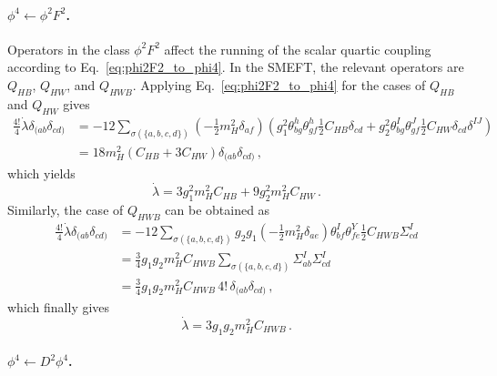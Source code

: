 \paragraph{\texorpdfstring{$\phi^4\leftarrow \phi^2 F^2$}{phi4fromphi2F2}.} 
Operators in the class $\phi^2 F^2$ affect the running of the scalar quartic coupling according to Eq.~\eqref{eq:phi2F2_to_phi4}. In the SMEFT, the relevant operators are $Q_{HB}$, $Q_{HW}$, and $Q_{HWB}$. Applying Eq.~\eqref{eq:phi2F2_to_phi4} for the cases of $Q_{HB}$ and $Q_{HW}$ gives
\begin{align}
    \frac{4!}{4}\dot{\lambda}\delta_{(ab}\delta_{cd)} &= - 12 \sum_{\sigma(\{a,b,c,d\})} \left(-\frac{1}{2}m_H^2\delta_{af}\right)\left( g_1^2\theta_{bg}^h\theta_{gf}^h\frac{1}{2}C_{HB}\delta_{cd}+g_2^2\theta_{bg}^I\theta_{gf}^J\frac{1}{2}C_{HW}\delta_{cd}\delta^{IJ}\right)\nonumber\\
    &= 18 m_H^2 \left(C_{HB} +3 C_{HW}\right)\delta_{(ab}\delta_{cd)}\,,
\end{align}
which yields
\begin{equation}
    \dot{\lambda} = 3 g_1^2 m_H^2 C_{HB} + 9 g_2^2 m_H^2 C_{HW}\,.
\end{equation}
Similarly, the case of $Q_{HWB}$ can be obtained as
\begin{align}
    \frac{4!}{4}\dot{\lambda}\delta_{(ab}\delta_{cd)} &= - 12 \sum_{\sigma(\{a,b,c,d\})} g_2 g_1 \left(-\frac{1}{2}m_H^2\delta_{ae}\right) \theta_{bf}^I\theta^Y_{fe} \frac{1}{2} C_{HWB} \Sigma_{cd}^I\nonumber\\
    &= \frac{3}{4}g_1 g_2 m_H^2 C_{HWB} \sum_{\sigma(\{a,b,c,d\})} \Sigma_{ab}^I \Sigma_{cd}^I\nonumber\\
    &= \frac{3}{4}g_1 g_2 m_H^2 C_{HWB}\, 4!\, \delta_{(ab}\delta_{cd)}\,,
\end{align}
which finally gives
\begin{equation}
    \dot\lambda = 3 g_1 g_2 m_{H}^2 C_{HWB}\,.
\end{equation}

\paragraph{\texorpdfstring{$\phi^4\leftarrow D^2 \phi^4$}{phi4fromD2phi4}.}

